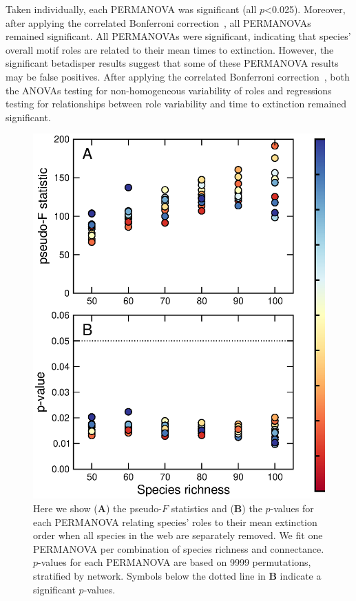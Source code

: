 \documentclass[12pt]{article}
\begin{document}
		Taken individually, each PERMANOVA was significant (all $p$\textless0.025). Moreover, after applying the correlated Bonferroni correction~\citep{Drezner2016}, all PERMANOVAs remained significant.
		All PERMANOVAs were significant, indicating that species' overall motif roles are related to their mean times to extinction.
		However, the significant betadisper results suggest that some of these PERMANOVA results may be false positives.
		After applying the correlated Bonferroni correction~\citep{Drezner2016}, both the ANOVAs testing for non-homogeneous variability of roles and regressions testing for relationships between role variability and time to extinction remained significant.


		\begin{figure}[h!]
			\caption{Here we show (\textbf{A}) the pseudo-$F$ statistics and (\textbf{B}) the $p$-values for each PERMANOVA relating species' roles to their mean extinction order when all species in the web are separately removed. We fit one PERMANOVA per combination of species richness and connectance. $p$-values for each PERMANOVA are based on 9999 permutations, stratified by network. Symbols below the dotted line in \textbf{B} indicate a significant $p$-values. }
			\label{permfig}
			\includegraphics[height=.5\textheight]{figures/extinction_order/permanova_summary_paper_full.eps}
			\end{figure}
\end{document}
